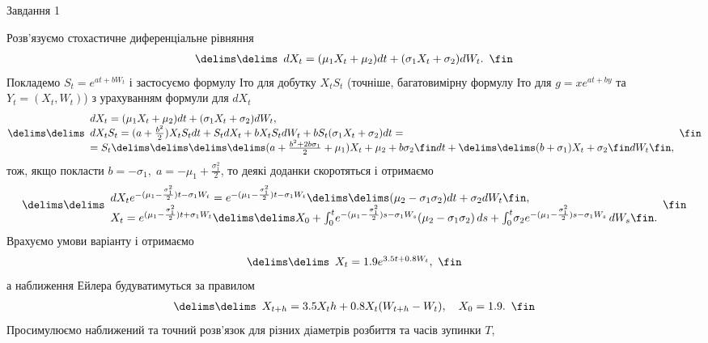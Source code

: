 \documentclass[12pt]{article}
\makeatletter
\def\@bra#1#2\delims#3\fin{\kern-\nulldelimiterspace\left#1#3\right#2\kern-\nulldelimiterspace}
\newcommand\bra[2][()]{\@bra#1\delims#2\fin}
\newcommand\eq[3][..]{\begin{equation*}\bra[#1]{\begin{array}{#2}#3\end{array}}\end{equation*}}
\makeatother
\begin{document}
\centerline{Завдання 1}
Розв'язуємо стохастичне диференціальне рівняння
\eq{c}{dX_t = (\mu_1X_t + \mu_2)dt + (\sigma_1X_t + \sigma_2)dW_t.}
Покладемо $S_t = e^{at + bW_t}$ і застосуємо формулу Іто для добутку $X_tS_t$ (точніше, багатовимірну формулу Іто для $g = xe^{at+by}$ та $Y_t = (X_t, W_t)$) з урахуванням формули для $dX_t$
\eq{l}{
dX_t = (\mu_1X_t + \mu_2)dt + (\sigma_1X_t + \sigma_2)dW_t,\\
dX_tS_t = (a + \frac{b^2}{2})X_tS_tdt + S_tdX_t + bX_tS_tdW_t + bS_t(\sigma_1X_t + \sigma_2)dt =\\
= S_t\bra{\bra{(a + \frac{b^2 + 2b\sigma_1}{2} + \mu_1)X_t + \mu_2 + b\sigma_2}dt + \bra{(b + \sigma_1)X_t + \sigma_2}dW_t},}
тож, якщо покласти $b = -\sigma_1,\;a = -\mu_1 + \frac{\sigma_1^2}{2}$, то деякі доданки скоротяться і отримаємо
\eq{l}{
dX_te^{-(\mu_1 - \frac{\sigma_1^2}{2})t-\sigma_1W_t} = e^{-(\mu_1- \frac{\sigma_1^2}{2})t - \sigma_1W_t}\bra{(\mu_2 - \sigma_1\sigma_2)dt + \sigma_2dW_t},\\
X_t = e^{(\mu_1 - \frac{\sigma_1^2}{2})t + \sigma_1W_t}\bra{X_0 + \int_0^t{\!e^{-(\mu_1 - \frac{\sigma_1^2}{2})s-\sigma_1W_s}(\mu_2 - \sigma_1\sigma_2)\,ds} + \int_0^t{\!\sigma_2e^{-(\mu_1 - \frac{\sigma_1^2}{2})s - \sigma_1W_s}\,dW_s}}.
}
Врахуємо умови варіанту і отримаємо
\eq{c}{X_t = 1.9e^{3.5t + 0.8W_t},}
а наближення Ейлера будуватимуться за правилом
\eq{c}{X_{t+h} = 3.5X_th + 0.8X_t(W_{t+h}-W_t),\quad X_0 = 1.9.}
Просимулюємо наближений та точний розв'язок для різних діаметрів розбиття та часів зупинки $T$,
\\
\\
\end{document}
